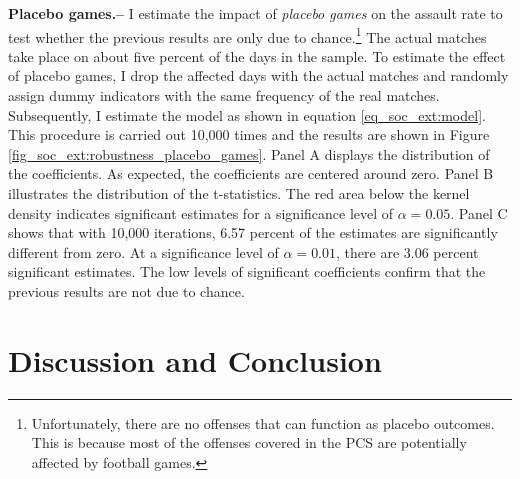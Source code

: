 

\textbf{Placebo games.--} I estimate the impact of \textit{placebo games} on the assault rate to test whether the previous results are only due to chance.\footnote{Unfortunately, there are no offenses that can function as placebo outcomes. This is because most of the offenses covered in the PCS are potentially affected by football games.} The actual matches take place on about five percent of the days in the sample. To estimate the effect of placebo games, I drop the affected days with the actual matches and randomly assign dummy indicators with the same frequency of the real matches. Subsequently, I estimate the model as shown in equation \ref{eq_soc_ext:model}. This procedure is carried out 10,000 times and the results are shown in Figure \ref{fig_soc_ext:robustness_placebo_games}. Panel A displays the distribution of the coefficients. As expected, the coefficients are centered around zero. Panel B illustrates the distribution of the t-statistics. The red area below the kernel density indicates significant estimates for a significance level of $\alpha=0.05$. Panel C shows that with 10,000 iterations, 6.57 percent of the estimates are significantly different from zero. At a significance level of $\alpha=0.01$, there are 3.06 percent significant estimates. The low levels of significant coefficients confirm that the previous results are not due to chance. 













\bigskip
\section{Discussion and Conclusion}\label{sec_soc_ext:conclusion}

